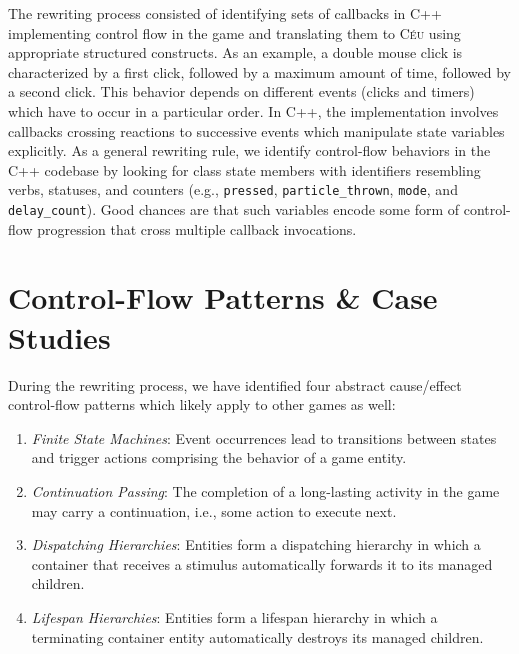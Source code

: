 \documentclass{vgtc}                          %
\newcommand{\CEU}{\textsc{C\'{e}u}\xspace}
\newcommand{\code}[1] {{\small{\texttt{#1}}}}
\begin{document}
The rewriting process consisted of identifying sets of callbacks in C++
implementing control flow in the game and translating them to \CEU using
appropriate structured constructs.
%
As an example, a double mouse click is characterized by a first click, followed
by a maximum amount of time, followed by a second click.
This behavior depends on different events (clicks and timers) which have to
occur in a particular order.
In C++, the implementation involves callbacks crossing reactions to successive
events which manipulate state variables explicitly.
%
As a general rewriting rule, we identify control-flow behaviors in the C++
codebase by looking for class state members with identifiers resembling verbs,
statuses, and counters (e.g.,
\code{pressed},
\code{particle\_thrown},
\code{mode}, and
\code{delay\_count}).
Good chances are that such variables encode some form of control-flow
progression that cross multiple callback invocations.

\section{Control-Flow Patterns \& Case Studies}
\label{sec.pats}

During the rewriting process, we have identified four abstract cause/effect
control-flow patterns which likely apply to other games as well:

\begin{enumerate}
\item \emph{Finite State Machines}:
    Event occurrences lead to transitions between states and trigger actions
    comprising the behavior of a game entity.
\item \emph{Continuation Passing}:
    The completion of a long-lasting activity in the game may carry a
    continuation, i.e., some action to execute next.
\item \emph{Dispatching Hierarchies}:
    Entities form a dispatching hierarchy in which a container that receives a
    stimulus automatically forwards it to its managed children.
\item \emph{Lifespan Hierarchies}:
    Entities form a lifespan hierarchy in which a terminating container entity
    automatically destroys its managed children.
\end{enumerate}
\end{document}
